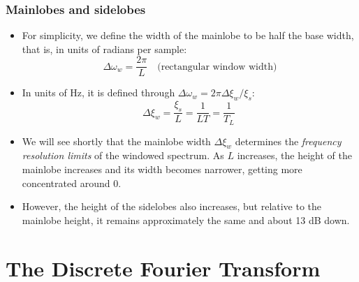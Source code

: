 \begin{frame}
\frametitle{Mainlobes and sidelobes}
\begin{itemize}
\item  For simplicity, we  define the width of the mainlobe  to be half the base width, that is, in units of radians per sample:
$$
\Delta\omega_{w}=\frac{2\pi}{L} \quad \text{(rectangular window width)}
$$
\item In units of Hz, it is defined through $\Delta\omega_{w}=2\pi\Delta \xi_{w}/\xi_{s}$:
$$
\Delta \xi_{w}=\frac{\xi_{s}}{L}=\frac{1}{LT}=\frac{1}{T_{L}}\
$$
\item We will see shortly that the mainlobe width $\Delta \xi_{w}$ determines the {\it frequency resolution limits} of the windowed spectrum. As $L$ increases, the height of the mainlobe increases and its width becomes narrower, getting more concentrated around 0. 
\item However, the height of the sidelobes also increases, but \alert{relative} to the mainlobe height, it remains approximately the same and about 13 dB down.
\end{itemize}
\end{frame}

\section{The Discrete Fourier Transform}

 